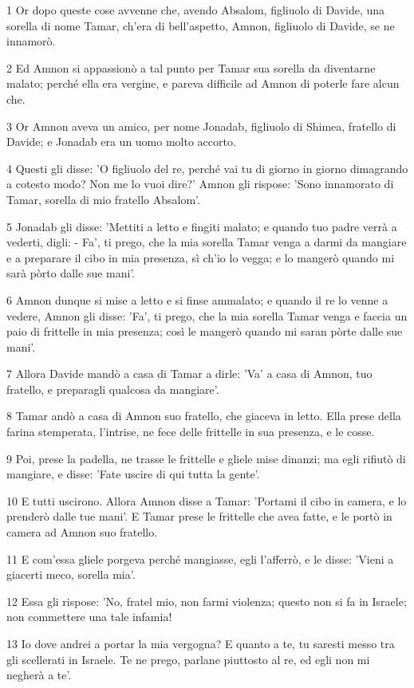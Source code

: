 \par 1 Or dopo queste cose avvenne che, avendo Absalom, figliuolo di Davide, una sorella di nome Tamar, ch'era di bell'aspetto, Amnon, figliuolo di Davide, se ne innamorò.
\par 2 Ed Amnon si appassionò a tal punto per Tamar sua sorella da diventarne malato; perché ella era vergine, e pareva difficile ad Amnon di poterle fare alcun che.
\par 3 Or Amnon aveva un amico, per nome Jonadab, figliuolo di Shimea, fratello di Davide; e Jonadab era un uomo molto accorto.
\par 4 Questi gli disse: 'O figliuolo del re, perché vai tu di giorno in giorno dimagrando a cotesto modo? Non me lo vuoi dire?' Amnon gli rispose: 'Sono innamorato di Tamar, sorella di mio fratello Absalom'.
\par 5 Jonadab gli disse: 'Mettiti a letto e fingiti malato; e quando tuo padre verrà a vederti, digli: - Fa', ti prego, che la mia sorella Tamar venga a darmi da mangiare e a preparare il cibo in mia presenza, sì ch'io lo vegga; e lo mangerò quando mi sarà pòrto dalle sue mani'.
\par 6 Amnon dunque si mise a letto e si finse ammalato; e quando il re lo venne a vedere, Amnon gli disse: 'Fa', ti prego, che la mia sorella Tamar venga e faccia un paio di frittelle in mia presenza; così le mangerò quando mi saran pòrte dalle sue mani'.
\par 7 Allora Davide mandò a casa di Tamar a dirle: 'Va' a casa di Amnon, tuo fratello, e preparagli qualcosa da mangiare'.
\par 8 Tamar andò a casa di Amnon suo fratello, che giaceva in letto. Ella prese della farina stemperata, l'intrise, ne fece delle frittelle in sua presenza, e le cosse.
\par 9 Poi, prese la padella, ne trasse le frittelle e gliele mise dinanzi; ma egli rifiutò di mangiare, e disse: 'Fate uscire di qui tutta la gente'.
\par 10 E tutti uscirono. Allora Amnon disse a Tamar: 'Portami il cibo in camera, e lo prenderò dalle tue mani'. E Tamar prese le frittelle che avea fatte, e le portò in camera ad Amnon suo fratello.
\par 11 E com'essa gliele porgeva perché mangiasse, egli l'afferrò, e le disse: 'Vieni a giacerti meco, sorella mia'.
\par 12 Essa gli rispose: 'No, fratel mio, non farmi violenza; questo non si fa in Israele; non commettere una tale infamia!
\par 13 Io dove andrei a portar la mia vergogna? E quanto a te, tu saresti messo tra gli scellerati in Israele. Te ne prego, parlane piuttosto al re, ed egli non mi negherà a te'.

